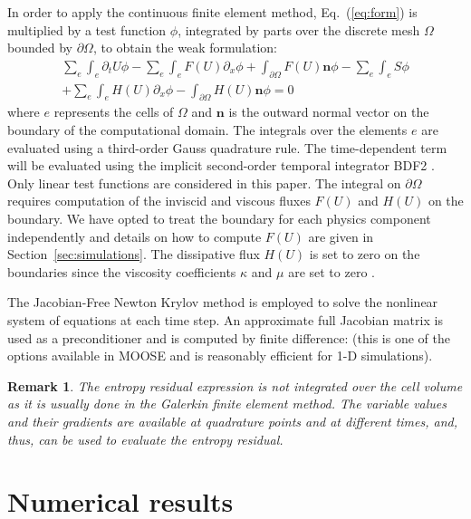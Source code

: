 \documentclass[review]{elsarticle}
\newtheorem{remark}{Remark}[section]
\newcommand{\eqt}[1]{Eq.~(\ref{#1})}                     %
\newcommand{\sect}[1]{Section~\ref{#1}}                     %
\begin{document}
In order to apply the continuous finite element method, \eqt{eq:form} is multiplied by a test function $\phi$, integrated by parts over the discrete mesh $\Omega$ bounded by $\partial \Omega$, to obtain the weak formulation:
\begin{multline}
\sum_e \int_{e} \partial_t U \phi - \sum_e \int_{e} F(U) \partial_x \phi + \int_{\partial \Omega} F(U) \mathbf{n} \phi - 
 \sum_e \int_{e} S \phi \\
 + \sum_e \int_{e} H(U) \partial_x \phi - \int_{\partial \Omega}H \left( U \right) \mathbf{n} \phi= 0
\end{multline}
where $e$ represents the cells of $\Omega$ and $\mathbf{n}$ is the outward normal vector on the boundary of the computational domain. 
The integrals over the elements $e$ are evaluated using a third-order Gauss quadrature rule. The time-dependent term will be evaluated using the implicit second-order temporal integrator BDF2 \cite{Leveque}. Only linear test functions are considered in this paper.
The integral on $\partial \Omega$ requires computation of the inviscid and viscous fluxes $F(U)$ and $H(U)$ on the boundary. We have opted to treat the boundary for each physics component independently and details on how to compute $F(U)$ are given in \sect{sec:simulations}. The dissipative flux $H(U)$ is set to zero on the boundaries since the viscosity coefficients $\kappa$ and $\mu$ are set to zero \cite{jlg1, jlg2, valentin}. 

The Jacobian-Free Newton Krylov method \cite{JFNK} is employed to solve the nonlinear system of equations at each time step.
An approximate full Jacobian matrix is used as a preconditioner and is computed by finite difference: (this is one of the options available in MOOSE and is reasonably efficient for 1-D simulations). 

\begin{remark}
The entropy residual expression is not integrated over the cell volume as it is usually done in the Galerkin finite element method. The variable values and their gradients are available at quadrature points and at different times, and, thus, can be used to evaluate the entropy residual. 
\end{remark}

\section{Numerical results}
\label{sec:num-res}
\end{document}
